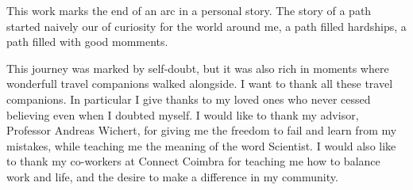 
\begin{acknowledgments} 

This work marks the end of an arc in a personal story. The story of a path started naively our of curiosity for the world around me, a path filled hardships, a path filled with good momments.

This journey was marked by self-doubt, but it was also rich in moments where wonderfull travel companions walked alongside. I want to thank all these travel companions.
In particular I give thanks to my loved ones who never cessed believing even when I doubted myself.
I would like to thank my advisor, Professor Andreas Wichert, for giving me the freedom to fail and learn from my mistakes, while teaching me the meaning of the word Scientist.
I would also like to thank my co-workers at Connect Coimbra for teaching me how to balance work and life, and the desire to make a difference in my community.
 
\end{acknowledgments}
\clearpage
\thispagestyle{empty}
\cleardoublepage